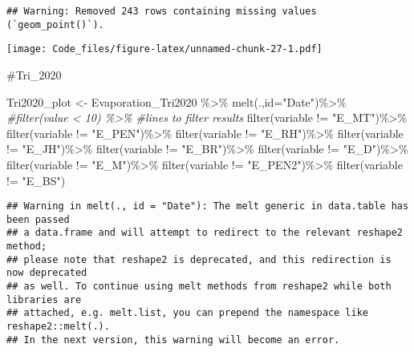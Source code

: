 \documentclass[
]{article}
\newenvironment{Shaded}{\begin{snugshade}}{\end{snugshade}}
\newcommand{\AttributeTok}[1]{\textcolor[rgb]{0.77,0.63,0.00}{#1}}
\newcommand{\CommentTok}[1]{\textcolor[rgb]{0.56,0.35,0.01}{\textit{#1}}}
\newcommand{\FunctionTok}[1]{\textcolor[rgb]{0.00,0.00,0.00}{#1}}
\newcommand{\NormalTok}[1]{#1}
\newcommand{\OtherTok}[1]{\textcolor[rgb]{0.56,0.35,0.01}{#1}}
\newcommand{\SpecialCharTok}[1]{\textcolor[rgb]{0.00,0.00,0.00}{#1}}
\newcommand{\StringTok}[1]{\textcolor[rgb]{0.31,0.60,0.02}{#1}}
\begin{document}
\begin{verbatim}
## Warning: Removed 243 rows containing missing values (`geom_point()`).
\end{verbatim}

\texttt{[image: Code\_files/figure-latex/unnamed-chunk-27-1.pdf]}

\#Tri\_2020

\begin{Shaded}
\begin{Highlighting}[]
\NormalTok{Tri2020\_plot }\OtherTok{\textless{}{-}}\NormalTok{ Evaporation\_Tri2020 }\SpecialCharTok{\%\textgreater{}\%} 
  \FunctionTok{melt}\NormalTok{(.,}\AttributeTok{id=}\StringTok{"Date"}\NormalTok{)}\SpecialCharTok{\%\textgreater{}\%} 
  \CommentTok{\#filter(value \textless{} 10) \%\textgreater{}\%               \#lines to filter results}
  \FunctionTok{filter}\NormalTok{(variable }\SpecialCharTok{!=} \StringTok{"E\_MT"}\NormalTok{)}\SpecialCharTok{\%\textgreater{}\%}
  \FunctionTok{filter}\NormalTok{(variable }\SpecialCharTok{!=} \StringTok{"E\_PEN"}\NormalTok{)}\SpecialCharTok{\%\textgreater{}\%}
  \FunctionTok{filter}\NormalTok{(variable }\SpecialCharTok{!=} \StringTok{"E\_RH"}\NormalTok{)}\SpecialCharTok{\%\textgreater{}\%}
  \FunctionTok{filter}\NormalTok{(variable }\SpecialCharTok{!=} \StringTok{"E\_JH"}\NormalTok{)}\SpecialCharTok{\%\textgreater{}\%}
  \FunctionTok{filter}\NormalTok{(variable }\SpecialCharTok{!=} \StringTok{"E\_BR"}\NormalTok{)}\SpecialCharTok{\%\textgreater{}\%}
  \FunctionTok{filter}\NormalTok{(variable }\SpecialCharTok{!=} \StringTok{"E\_D"}\NormalTok{)}\SpecialCharTok{\%\textgreater{}\%}
  \FunctionTok{filter}\NormalTok{(variable }\SpecialCharTok{!=} \StringTok{"E\_M"}\NormalTok{)}\SpecialCharTok{\%\textgreater{}\%}
  \FunctionTok{filter}\NormalTok{(variable }\SpecialCharTok{!=} \StringTok{"E\_PEN2"}\NormalTok{)}\SpecialCharTok{\%\textgreater{}\%}
  \FunctionTok{filter}\NormalTok{(variable }\SpecialCharTok{!=} \StringTok{"E\_BS"}\NormalTok{)}
\end{Highlighting}
\end{Shaded}

\begin{verbatim}
## Warning in melt(., id = "Date"): The melt generic in data.table has been passed
## a data.frame and will attempt to redirect to the relevant reshape2 method;
## please note that reshape2 is deprecated, and this redirection is now deprecated
## as well. To continue using melt methods from reshape2 while both libraries are
## attached, e.g. melt.list, you can prepend the namespace like reshape2::melt(.).
## In the next version, this warning will become an error.
\end{verbatim}
\end{document}
